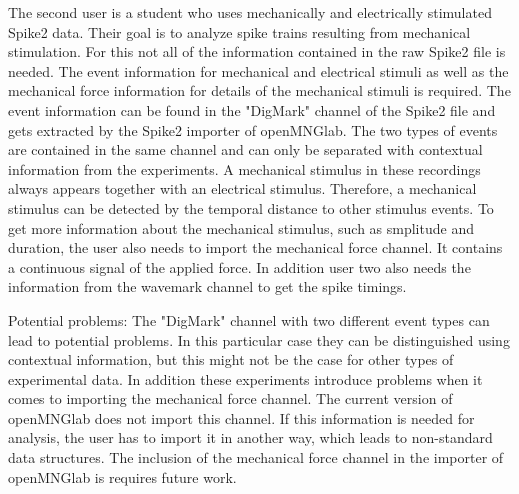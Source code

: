 The second user is a student who uses mechanically and electrically stimulated Spike2 data. Their goal is to analyze spike trains resulting from mechanical stimulation. For this not all of the information contained in the raw Spike2 file is needed. The event information for mechanical and electrical stimuli as well as the mechanical force information for details of the mechanical stimuli is required. The event information can be found in the "DigMark" channel of the Spike2 file and gets extracted by the Spike2 importer of openMNGlab. The two types of events are contained in the same channel and can only be separated with contextual information from the experiments. A mechanical stimulus in these recordings always appears together with an electrical stimulus. Therefore, a mechanical stimulus can be detected by the temporal distance to other stimulus events.
To get more information about the mechanical stimulus, such as smplitude and duration, the user also needs to import the mechanical force channel. It contains a continuous signal of the applied force. In addition user two also needs the information from the wavemark channel to get the spike timings.

Potential problems: The "DigMark" channel with two different event types can lead to potential problems. In this particular case they can be distinguished using contextual information, but this might not be the case for other types of experimental data. In addition these experiments introduce problems when it comes to importing the mechanical force channel. The current version of openMNGlab does not import this channel. If this information is needed for analysis, the user has to import it in another way, which leads to non-standard data structures. The inclusion of the mechanical force channel in the importer of openMNGlab is requires future work.

